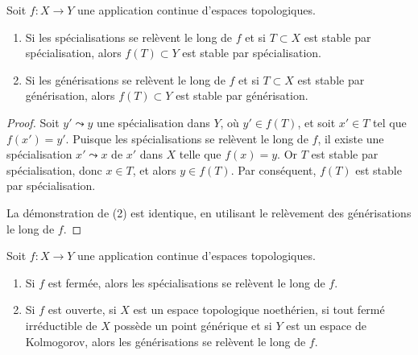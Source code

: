 \begin{lemma}
\label{lemma-lift-specializations-images}
Soit $f : X \to Y$ une application continue d'espaces topologiques.
\begin{enumerate}
\item Si les spécialisations se relèvent le long de $f$ et si $T \subset X$
est stable par spécialisation, alors $f(T) \subset Y$ est stable par
spécialisation.
\item Si les générisations se relèvent le long de $f$ et si $T \subset X$ est
stable par générisation, alors $f(T) \subset Y$ est stable par générisation.
\end{enumerate}
\end{lemma}

\begin{proof}
Soit $y' \leadsto y$ une spécialisation dans $Y$, où $y'\in f(T)$, et soit
$x'\in T$ tel que $f(x') = y'$. Puisque les spécialisations se relèvent le
long de $f$, il existe une spécialisation $x'\leadsto x$ de $x'$ dans $X$
telle que $f(x) = y$. Or $T$ est stable par spécialisation, donc $x\in T$, et
alors $y \in f(T)$. Par conséquent, $f(T)$ est stable par spécialisation.

\medskip\noindent
La démonstration de (2) est identique, en utilisant le relèvement des
générisations le long de $f$.
\end{proof}

\begin{lemma}
\label{lemma-closed-open-map-specialization}
Soit $f : X \to Y$ une application continue d'espaces topologiques.
\begin{enumerate}
\item Si $f$ est fermée, alors les spécialisations se relèvent le long de $f$.
\item Si $f$ est ouverte, si $X$ est un espace topologique noethérien, si tout
fermé irréductible de $X$ possède un point générique et si $Y$ est un espace
de Kolmogorov, alors les générisations se relèvent le long de $f$.
\end{enumerate}
\end{lemma}

